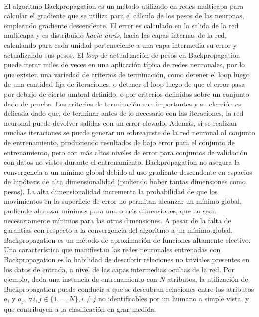 \paragraph{}El algoritmo Backpropagation es un método utilizado en redes multicapa para calcular el gradiente que se utiliza para el cálculo de los pesos de las neuronas, empleando gradiente descendente.
El error es calculado en la salida de la red multicapa y es distribuido \textit{hacia atrás}, hacia las capas internas de la red, calculando para cada unidad perteneciente a una capa intermedia su error y actualizando sus pesos.
El \textit{loop} de actualización de pesos en Backpropagation puede iterar miles de veces en una aplicación típica de redes neuronales, por lo que existen una variedad de criterios de terminación, como detener el loop luego de una cantidad fija de iteraciones, o detener el loop luego de que el error pasa por debajo de cierto umbral definido, o por criterios definidos sobre un conjunto dado de prueba. 
Los criterios de terminación son importantes y su elección es delicada dado que, de terminar antes de lo necesario con las iteraciones, la red neuronal puede devolver salidas con un error elevado.
Además, si se realizan muchas iteraciones se puede generar un sobreajuste de la red neuronal al conjunto de entrenamiento, produciendo resultados de bajo error para el conjunto de entrenamiento, pero con más altos niveles de error para conjuntos de validación con datos no vistos durante el entrenamiento.
Backpropagation no asegura la convergencia a un mínimo global debido al uso gradiente descendente en espacios de hipótesis de alta dimensionalidad (pudiendo haber tantas dimensiones como pesos).
La alta dimensionalidad incrementa la probabilidad de que los movimientos en la superficie de error no permitan alcanzar un mínimo global, pudiendo alcanzar mínimos para una o más dimensiones, que no sean necesariamente mínimos para las otras dimensiones.
A pesar de la falta de garantías con respecto a la convergencia del algoritmo a un mínimo global, Backpropagation es un método de aproximación de funciones altamente efectivo.
Una característica que manifiestan las redes neuronales entrenadas con Backpropagation es la habilidad de descubrir relaciones no triviales presentes en los datos de entrada, a nivel de las capas intermedias ocultas de la red.
Por ejemplo, dada una instancia de entrenamiento con $N$ atributos, la utilización de Backpropagation puede conducir a que se descubran relaciones entre los atributos $a_i$ y $a_j$,  $\forall i, j \in \{1, \dots, N\}, i \neq j$ no identificables por un humano a simple vista, y que contribuyen a la clasificación en gran medida.

